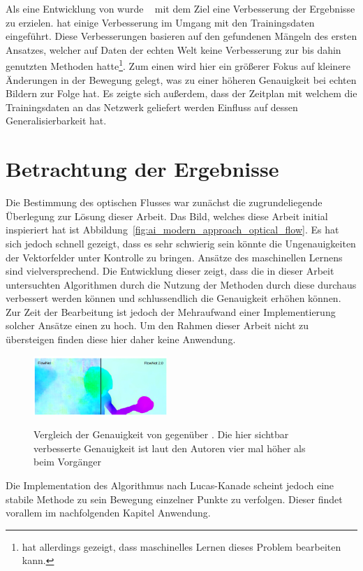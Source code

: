 Als eine Entwicklung von  wurde ~\cite{Ilg2016} mit dem Ziel eine Verbesserung der Ergebnisse zu erzielen.
 hat einige Verbesserung im Umgang mit den Trainingsdaten eingeführt.
Diese Verbesserungen basieren auf den gefundenen Mängeln des ersten Ansatzes, welcher auf Daten der echten Welt keine Verbesserung zur bis dahin genutzten Methoden hatte\footnote{ hat allerdings gezeigt, dass maschinelles Lernen dieses Problem bearbeiten kann.}.
Zum einen wird hier ein grö{\ss}erer Fokus auf kleinere Änderungen in der Bewegung gelegt, was zu einer höheren Genauigkeit bei echten Bildern zur Folge hat.
Es zeigte sich au{\ss}erdem, dass der Zeitplan mit welchem die Trainingsdaten an das Netzwerk geliefert werden Einfluss auf dessen Generalisierbarkeit hat.

\section{Betrachtung der Ergebnisse}

Die Bestimmung des optischen Flusses war zunächst die zugrundeliegende Überlegung zur Lösung dieser Arbeit.
Das Bild, welches diese Arbeit initial inspieriert hat ist Abbildung~\ref{fig:ai_modern_approach_optical_flow}.
Es hat sich jedoch schnell gezeigt, dass es sehr schwierig sein könnte die Ungenauigkeiten der Vektorfelder unter Kontrolle zu bringen.
Ansätze des maschinellen Lernens sind vielversprechend.
Die Entwicklung dieser zeigt, dass die in dieser Arbeit untersuchten Algorithmen durch die Nutzung der Methoden durch diese durchaus verbessert werden können und schlussendlich die Genauigkeit erhöhen können.
Zur Zeit der Bearbeitung ist jedoch der Mehraufwand einer Implementierung solcher Ansätze einen zu hoch.
Um den Rahmen dieser Arbeit nicht zu übersteigen finden diese hier daher keine Anwendung.

\begin{figure}
    \centering
    \includegraphics[width=0.45\textwidth]{gfx/flownet_vs_flownet2.png}
    \label{fig:flownet_vs_flownet2}
    \caption[Vergleich  zu ]{Vergleich der Genauigkeit von  gegenüber . Die hier sichtbar verbesserte Genauigkeit ist laut den Autoren vier mal höher als beim Vorgänger~\cite{Ilg2016}}
\end{figure}

Die Implementation des Algorithmus nach Lucas-Kanade scheint jedoch eine stabile Methode zu sein Bewegung einzelner Punkte zu verfolgen.
Dieser findet vorallem im nachfolgenden Kapitel Anwendung.
